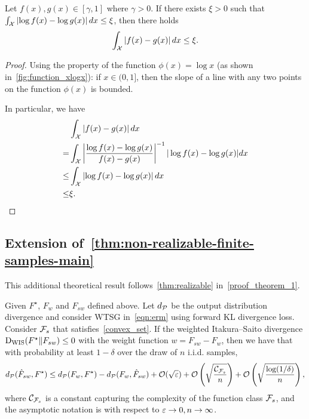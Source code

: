 \begin{claim} \label{claim_xlnx_reverse}
Let $f(x), g(x) \in [\gamma,1]$ where $\gamma>0$. If there exists $\xi>0$ such that $\int_{\mathcal{X}} \left| \log f(x) - \log g(x) \right| d x \le \xi$,
then there holds
$$\int_{\mathcal{X}} \left| f(x)- g(x) \right| d x \le \xi.$$
\end{claim}


\begin{proof}

Using the property of the function $\phi(x)=\log x$ (as shown in~\cref{fig:function_xlogx}):
if $x \in (0,1]$, then the slope of a line with any two points on the function $\phi(x)$ is bounded.

In particular, we have
\begin{align*}
    & \int_{\mathcal{X}} \left|f(x)-g(x) \right| d x \nonumber \\ = & \int_{\mathcal{X}} \left|\frac{\log f(x)-\log g(x)}{f(x)-g(x)}\right|^{-1} |\log f(x)-\log g(x)| d x \nonumber \\ \le & \int_{\mathcal{X}} \left|\log f(x)-\log g(x) \right| d x \nonumber \\ \le & \xi.
\end{align*}
\end{proof}








\subsection{Extension of~\cref{thm:non-realizable-finite-samples-main}} \label{proof_non-realizable}

This additional theoretical result follows~\cref{thm:realizable} in~\cref{proof_theorem_1}.


\begin{corollary} \label{thm:non-realizable-finite-samples}
Given $F^\star$, $F_w$ and $F_{sw}$ defined above.
Let $d_\mathcal{P}$ be the output distribution divergence and consider WTSG in~\cref{eqn:erm} using forward KL divergence loss.
Consider $\mathcal{F}_s$ that satisfies~\cref{convex_set}.
If the weighted Itakura–Saito divergence $\mathrm{D}_{\mathrm{WIS}}(F^\star \| F_{sw}) \le 0$ with the weight function $w=F_{sw} - F_w$, then we have that with probability at least $1-\delta$ over the draw of $n$ i.i.d. samples,
\begin{align} 
d_\mathcal{P}(\hat{F}_{sw}, F^\star) \le d_\mathcal{P}(F_w, F^\star) - d_\mathcal{P}(F_w, \hat{F}_{sw}) + \mathcal{O}(\sqrt{\varepsilon}) +  \mathcal{O}\left(\sqrt{\frac{\mathcal{C}_{\mathcal{F}_s}}{n}}\right) + \mathcal{O}\left(\sqrt{\frac{\log(1/\delta)}{n}}\right),
\end{align}
where $\mathcal{C}_{\mathcal{F}_s}$ is a constant capturing the complexity of the function class $\mathcal{F}_s$, and the asymptotic notation is with respect to $\varepsilon \to 0, n \to \infty$.
\end{corollary}



